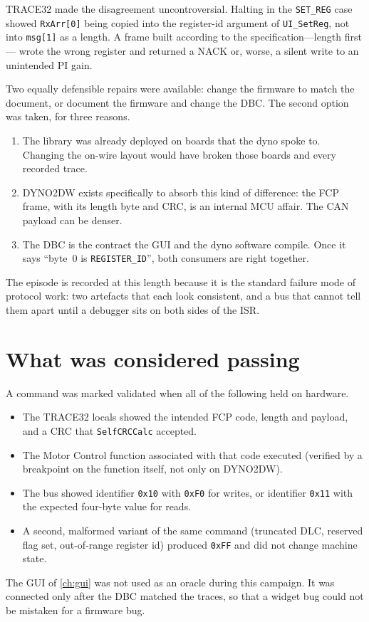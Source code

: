 TRACE32 made the disagreement uncontroversial. Halting in the
\texttt{SET\_REG} case showed \texttt{RxArr[0]} being copied into the
register-id argument of \texttt{UI\_SetReg}, not into \texttt{msg[1]}
as a length. A frame built according to the specification---length first---
wrote the wrong register and returned a NACK or, worse, a silent write
to an unintended PI gain.

Two equally defensible repairs were available: change the firmware to
match the document, or document the firmware and change the DBC. The
second option was taken, for three reasons.

\begin{enumerate}[leftmargin=1.6em]
  \item The library was already deployed on boards that the dyno spoke to.
        Changing the on-wire layout would have broken those boards and
        every recorded trace.
  \item DYNO2DW exists specifically to absorb this kind of difference: the
        FCP frame, with its length byte and CRC, is an internal MCU
        affair. The CAN payload can be denser.
  \item The DBC is the contract the GUI and the dyno software compile. Once
        it says ``byte~0 is \texttt{REGISTER\_ID}'', both consumers are
        right together.
\end{enumerate}

The episode is recorded at this length because it is the standard failure
mode of protocol work: two artefacts that each look consistent, and a bus
that cannot tell them apart until a debugger sits on both sides of the
ISR.

\section{What was considered passing}
\label{sec:pass-criteria}

A command was marked validated when all of the following held on hardware.

\begin{itemize}[leftmargin=1.6em]
  \item The TRACE32 locals showed the intended FCP code, length and
        payload, and a CRC that \texttt{SelfCRCCalc} accepted.
  \item The Motor Control function associated with that code executed
        (verified by a breakpoint on the function itself, not only on
        DYNO2DW).
  \item The bus showed identifier \texttt{0x10} with \texttt{0xF0} for
        writes, or identifier \texttt{0x11} with the expected four-byte
        value for reads.
  \item A second, malformed variant of the same command (truncated DLC,
        reserved flag set, out-of-range register id) produced
        \texttt{0xFF} and did not change machine state.
\end{itemize}

The GUI of \cref{ch:gui} was not used as an oracle during this campaign.
It was connected only after the DBC matched the traces, so that a widget
bug could not be mistaken for a firmware bug.
